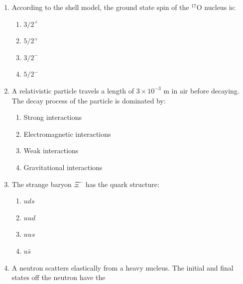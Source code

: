 \documentclass[journal,13pt,onecolumn]{IEEEtran}
\begin{document}
\begin{enumerate}[itemsep = 1em]
\item According to the shell model, the ground state spin of the $^{17}$O nucleus is:  

\hfill{}

\begin{multicols}{2}
\begin{enumerate}
    \item $3/2^+$
    \item $5/2^+$
    \item $3/2^-$
    \item $5/2^-$
\end{enumerate}
\end{multicols}

\item A relativistic particle travels a length of $3 \times 10^{-3}$ m in air before decaying. The decay process of the particle is dominated by:  

\hfill{}

\begin{multicols}{2}
\begin{enumerate}
    \item Strong interactions
    \item Electromagnetic interactions
    \item Weak interactions
    \item Gravitational interactions
\end{enumerate}
\end{multicols}

\item The strange baryon $\Xi^-$ has the quark structure:  

\hfill{}

\begin{multicols}{4}
\begin{enumerate}
    \item $uds$
    \item $uud$
    \item $uus$
    \item $u\bar{s}$
\end{enumerate} 
\end{multicols}


\item A neutron scatters elastically from a heavy nucleus. The initial and final states off the neutron have the

\hfill{}


\end{enumerate}
\end{document}
